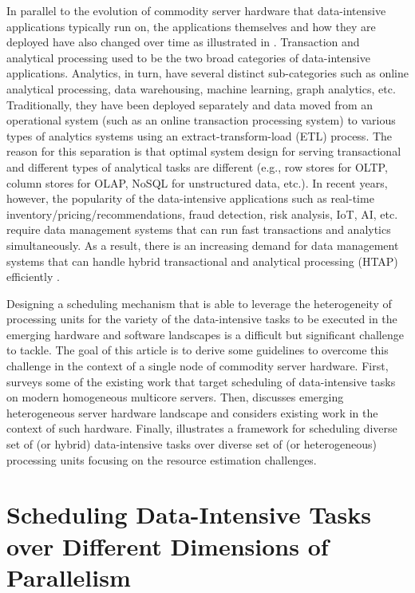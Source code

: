 \documentclass[11pt]{article}
\begin{document}
In parallel to the evolution of commodity server hardware that data-intensive applications typically run on,
the applications themselves and how they are deployed have also changed over time as illustrated in . 
Transaction and analytical processing used to be the two broad categories of data-intensive applications.
Analytics, in turn, have several distinct sub-categories such as
online analytical processing, data warehousing, machine learning, graph analytics, etc.
Traditionally, they have been deployed separately and data moved from an operational system
(such as an online transaction processing system)
to various types of analytics systems using an extract-transform-load (ETL) process. 
The reason for this separation is that optimal system design for serving
transactional and different types of analytical tasks are different
(e.g., row stores for OLTP, column stores for OLAP, NoSQL for unstructured data, etc.).
In recent years, however, the popularity of the data-intensive applications such as 
real-time inventory/pricing/recommendations, fraud detection, risk analysis, IoT, AI, etc.
require data management systems that can run fast transactions and analytics simultaneously.
As a result, there is an increasing demand for data management systems that can handle
hybrid transactional and analytical processing (HTAP) efficiently \cite{OzcanTT17}.

Designing a scheduling mechanism that is able to leverage the heterogeneity of
processing units for the variety of the data-intensive tasks to be executed
in the emerging hardware and software landscapes is a difficult but significant challenge to tackle. 
The goal of this article is to derive some guidelines to overcome this challenge
in the context of a single node of commodity server hardware.
First, 
surveys some of the existing work that target scheduling of data-intensive tasks on modern homogeneous multicore servers.
Then,  discusses emerging heterogeneous server hardware landscape and
considers existing work in the context of such hardware.
Finally, 
illustrates a framework for scheduling diverse set of (or hybrid) data-intensive tasks
over diverse set of (or heterogeneous) processing units focusing on the resource estimation challenges.

\section{Scheduling Data-Intensive Tasks over Different Dimensions of Parallelism}
\label{sec:sched}
\end{document}
